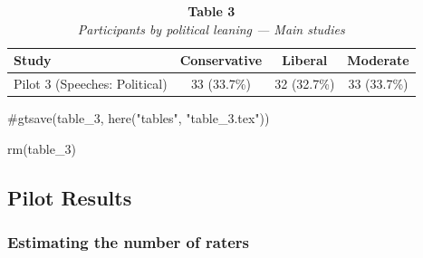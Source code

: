 \documentclass[
  man]{apa7}
\newenvironment{Shaded}{\begin{snugshade}}{\end{snugshade}}
\newcommand{\CommentTok}[1]{\textcolor[rgb]{0.37,0.37,0.37}{#1}}
\newcommand{\FunctionTok}[1]{\textcolor[rgb]{0.28,0.35,0.67}{#1}}
\newcommand{\NormalTok}[1]{\textcolor[rgb]{0.00,0.23,0.31}{#1}}
\begin{document}
\begin{table}
\caption*{
{\large \textbf{Table 3}} \\ 
{\small \emph{Participants by political leaning --- Main studies}}
} 
\fontsize{9.0pt}{10.8pt}\selectfont
\begin{tabular*}{\linewidth}{@{\extracolsep{\fill}}lccc}
\toprule
Study & Conservative & Liberal & Moderate \\ 
\midrule\addlinespace[2.5pt]
Pilot 3 (Speeches: Political) & 33 (33.7\%) & 32 (32.7\%) & 33 (33.7\%) \\ 
\bottomrule
\end{tabular*}
\end{table}

\begin{Shaded}
\begin{Highlighting}[]
\CommentTok{\#gtsave(table\_3, here("tables", "table\_3.tex"))}

\FunctionTok{rm}\NormalTok{(table\_3)}
\end{Highlighting}
\end{Shaded}

\subsection{Pilot Results}\label{pilot-results}

\subsubsection{Estimating the number of
raters}\label{estimating-the-number-of-raters}
\end{document}
